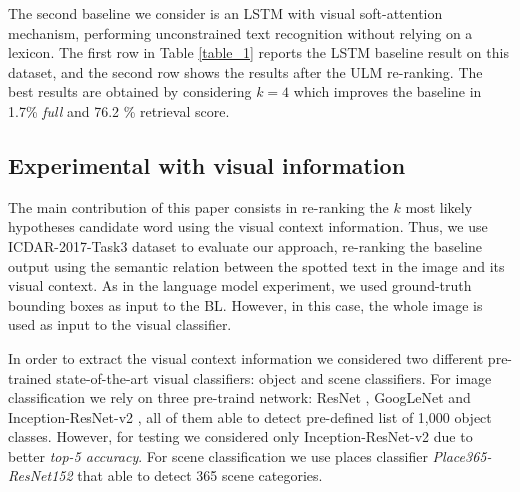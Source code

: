 \documentclass[phd,tocprelim]{cornell}
\begin{document}
The second  baseline we consider is an LSTM \cite{Suman:17} with visual soft-attention mechanism, performing unconstrained text recognition without relying on a lexicon. The first row in Table \ref{table_1} reports the LSTM baseline result on this dataset, and the second row shows the results after the ULM re-ranking. The best results are obtained by considering $k=4$ which improves the baseline in 1.7\% \textit{full} and 76.2 \% retrieval score.

\subsection{Experimental with visual information}


The main contribution of this paper consists in  re-ranking the $k$ most likely hypotheses candidate word using the visual context information. Thus, we use ICDAR-2017-Task3 dataset to evaluate our approach, re-ranking the baseline output using the semantic relation between the spotted text in the image and its visual context.  
As in the language model experiment, we used ground-truth bounding boxes as input to the BL. However, in this case, the whole image is used as input to the visual classifier.
 
 
In order to extract the visual context information we considered two different pre-trained state-of-the-art visual classifiers: object and scene classifiers. For image classification we rely on three pre-traind network:   
ResNet \cite{Kaiming:16}, GoogLeNet \cite{Szegedy15} and Inception-ResNet-v2 \cite{szegedy2017inception}, all of them able to detect pre-defined list of 1,000 object classes. However, for testing we considered only Inception-ResNet-v2 due to better \textit{top-5 accuracy}. For scene classification we use places classifier \textit{Place365-ResNet152} \cite{zhou2017places} that able to detect 365 scene categories.

\end{document}
